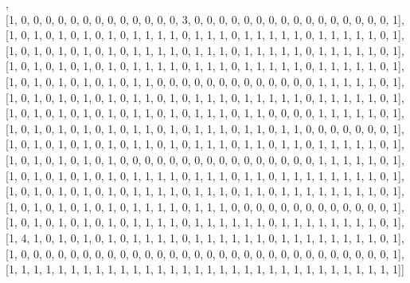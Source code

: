 \documentclass[11pt,a4paper,notitlepage]{report}
\begin{document}
\begin{center}
\begin{small}
					 [1, 0, 1, 1, 0, 1, 0, 1, 0, 1, 0, 1, 1, 1, 0, 1, 1, 1, 0, 1, 1, 1, 1, 1, 0, 1, 1, 1, 1, 1, 0, 1], \\ [0pt] 
					 [1, 0, 0, 0, 0, 0, 0, 0, 0, 0, 0, 0, 0, 0, 3, 0, 0, 0, 0, 0, 0, 0, 0, 0, 0, 0, 0, 0, 0, 0, 0, 1], \\ [0pt] 
					 [1, 0, 1, 0, 1, 0, 1, 0, 1, 0, 1, 1, 1, 1, 0, 1, 1, 1, 0, 1, 1, 1, 1, 1, 0, 1, 1, 1, 1, 1, 0, 1], \\ [0pt] 
					 [1, 0, 1, 0, 1, 0, 1, 0, 1, 0, 1, 1, 1, 1, 0, 1, 1, 1, 0, 1, 1, 1, 1, 1, 0, 1, 1, 1, 1, 1, 0, 1], \\ [0pt] 
					 [1, 0, 1, 0, 1, 0, 1, 0, 1, 0, 1, 1, 1, 1, 0, 1, 1, 1, 0, 1, 1, 1, 1, 1, 0, 1, 1, 1, 1, 1, 0, 1], \\ [0pt] 
					 [1, 0, 1, 0, 1, 0, 1, 0, 1, 0, 1, 1, 0, 0, 0, 0, 0, 0, 0, 0, 0, 0, 0, 0, 0, 1, 1, 1, 1, 1, 0, 1], \\ [0pt] 
					 [1, 0, 1, 0, 1, 0, 1, 0, 1, 0, 1, 1, 0, 1, 0, 1, 1, 1, 0, 1, 1, 1, 1, 1, 0, 1, 1, 1, 1, 1, 0, 1], \\ [0pt] 
					 [1, 0, 1, 0, 1, 0, 1, 0, 1, 0, 1, 1, 0, 1, 0, 1, 1, 1, 0, 1, 1, 0, 0, 0, 0, 1, 1, 1, 1, 1, 0, 1], \\ [0pt] 
					 [1, 0, 1, 0, 1, 0, 1, 0, 1, 0, 1, 1, 0, 1, 0, 1, 1, 1, 0, 1, 1, 0, 1, 1, 0, 0, 0, 0, 0, 0, 0, 1], \\ [0pt] 
					 [1, 0, 1, 0, 1, 0, 1, 0, 1, 0, 1, 1, 0, 1, 0, 1, 1, 1, 0, 1, 1, 0, 1, 1, 0, 1, 1, 1, 1, 1, 0, 1], \\ [0pt] 
					 [1, 0, 1, 0, 1, 0, 1, 0, 1, 0, 0, 0, 0, 0, 0, 0, 0, 0, 0, 0, 0, 0, 0, 0, 0, 1, 1, 1, 1, 1, 0, 1], \\ [0pt] 
					 [1, 0, 1, 0, 1, 0, 1, 0, 1, 0, 1, 1, 1, 1, 0, 1, 1, 1, 0, 1, 1, 0, 1, 1, 1, 1, 1, 1, 1, 1, 0, 1], \\ [0pt] 
					 [1, 0, 1, 0, 1, 0, 1, 0, 1, 0, 1, 1, 1, 1, 0, 1, 1, 1, 0, 1, 1, 0, 1, 1, 1, 1, 1, 1, 1, 1, 0, 1], \\ [0pt] 
					 [1, 0, 1, 0, 1, 0, 1, 0, 1, 0, 1, 1, 1, 1, 0, 1, 1, 1, 0, 0, 0, 0, 0, 0, 0, 0, 0, 0, 0, 0, 0, 1], \\ [0pt] 
					 [1, 0, 1, 0, 1, 0, 1, 0, 1, 0, 1, 1, 1, 1, 0, 1, 1, 1, 1, 1, 1, 0, 1, 1, 1, 1, 1, 1, 1, 1, 0, 1], \\ [0pt] 
					 [1, 4, 1, 0, 1, 0, 1, 0, 1, 0, 1, 1, 1, 1, 0, 1, 1, 1, 1, 1, 1, 0, 1, 1, 1, 1, 1, 1, 1, 1, 0, 1], \\ [0pt] 
					 [1, 0, 0, 0, 0, 0, 0, 0, 0, 0, 0, 0, 0, 0, 0, 0, 0, 0, 0, 0, 0, 0, 0, 0, 0, 0, 0, 0, 0, 0, 0, 1], \\ [0pt] 
					 [1, 1, 1, 1, 1, 1, 1, 1, 1, 1, 1, 1, 1, 1, 1, 1, 1, 1, 1, 1, 1, 1, 1, 1, 1, 1, 1, 1, 1, 1, 1, 1]] \\ [0pt] 
				\end{small}
				\end{center}
\end{document}
